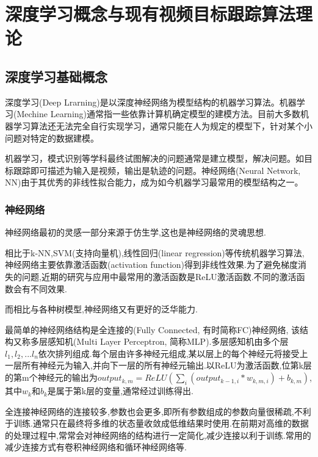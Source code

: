 \chapter{深度学习概念与现有视频目标跟踪算法理论}
\section{深度学习基础概念}
深度学习(Deep Lrarning)是以深度神经网络为模型结构的机器学习算法\supercite{deng2014deep}。机器学习(Mechine Learning)通常指一些依靠计算机确定模型的建模方法。目前大多数机器学习算法还无法完全自行实现学习，通常只能在人为规定的模型下，针对某个小问题对特定的数据建模。
\par
机器学习，模式识别等学科最终试图解决的问题通常是建立模型，解决问题。如目标跟踪即可描述为输入是视频，输出是轨迹的问题。神经网络(Neural Network, NN)由于其优秀的非线性拟合能力，成为如今机器学习最常用的模型结构之一。
\subsection{神经网络}
神经网络最初的灵感一部分来源于仿生学\supercite{mcculloch1943logical}\supercite{farley1954simulation},这也是神经网络的灵魂思想.
\par
相比于k-NN,SVM(支持向量机),线性回归(linear regression)等传统机器学习算法,神经网络主要依靠激活函数(activation function)得到非线性效果.为了避免梯度消失的问题,近期的研究与应用中最常用的激活函数是ReLU激活函数\supercite{krizhevsky2012imagenet}.不同的激活函数会有不同效果\supercite{karlik2011performance}.
\par
而相比与各种树模型,神经网络又有更好的泛华能力.
\par
最简单的神经网络结构是全连接的(Fully Connected, 有时简称FC)神经网络, 该结构又称多层感知机(Multi Layer Perceptron, 简称MLP).多层感知机由多个层$l_1,l_2,...l_n$依次排列组成.每个层由许多神经元组成,某以层上的每个神经元将接受上一层所有神经元为输入,并向下一层的所有神经元输出.以ReLU为激活函数,位第k层的第m个神经元的输出为$output_{k,m}=ReLU(\sum_{i} (output_{k-1,i}*w_{k,m,i})+b_{k,m})$,其中$w_{k}$和$b_{k}$是属于第k层的变量,通常经过训练得出.
\par
全连接神经网络的连接较多,参数也会更多,即所有参数组成的参数向量很稀疏,不利于训练.通常只在最终将多维的状态量收敛成低维结果时使用.在前期对高维的数据的处理过程中,常常会对神经网络的结构进行一定简化,减少连接以利于训练.常用的减少连接方式有卷积神经网络和循环神经网络等.
\par
